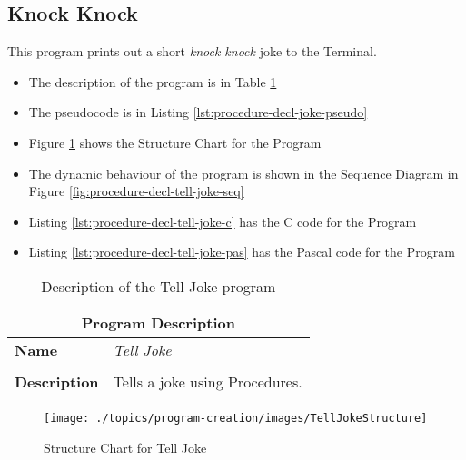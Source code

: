 \subsection{Knock Knock} %
\label{sub:knock_knock}

This program prints out a short \emph{knock knock} joke to the Terminal. 
\begin{itemize}
  \item The description of the program is in Table \ref{tbl:procedure-decl-joke}
  \item The pseudocode is in Listing \ref{lst:procedure-decl-joke-pseudo}
  \item Figure \ref{fig:procedure-decl-tell-joke-struct} shows the Structure Chart for the Program
  \item The dynamic behaviour of the program is shown in the Sequence Diagram in Figure \ref{fig:procedure-decl-tell-joke-seq}
  \item Listing \ref{lst:procedure-decl-tell-joke-c} has the C code for the Program
  \item Listing \ref{lst:procedure-decl-tell-joke-pas} has the Pascal code for the Program
\end{itemize}

\begin{table}[h]
\centering
\begin{tabular}{l|p{10cm}}
  \hline
  \multicolumn{2}{c}{\textbf{Program Description}} \\
  \hline
  \textbf{Name} & \emph{Tell Joke} \\
  \\
  \textbf{Description} & Tells a joke using Procedures. \\
  \hline
\end{tabular}
\caption{Description of the Tell Joke program}
\label{tbl:procedure-decl-joke}
\end{table}

\begin{figure}[h]
   \centering
   \texttt{[image: ./topics/program-creation/images/TellJokeStructure]} 
   \caption{Structure Chart for Tell Joke}
   \label{fig:procedure-decl-tell-joke-struct}
\end{figure}



